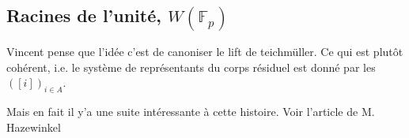 \documentclass[a4paper,12pt]{article}
\newcommand{\F}{\mathbb F}
\theoremstyle{plain}
\theoremstyle{definition}
\theoremstyle{remark}
\begin{document}
\subsection{Racines de l'unité, $W(\F_p)$}
Vincent pense que l'idée c'est de canoniser le lift de teichmüller.
Ce qui est plutôt cohérent, i.e. le système de représentants du
corps résiduel est donné par les $([i])_{i\in A}$.

Mais en fait il y'a une suite intéressante à cette histoire. 
Voir l'article de M. Hazewinkel
\end{document}
